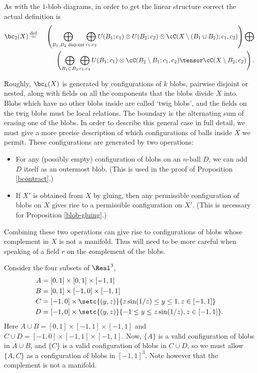 As with the $1$-blob diagrams, in order to get the linear structure correct the actual definition is 
\begin{eqnarray*}
	\bc_2(X) & \deq &
	\left( 
		\bigoplus_{B_1, B_2\; \text{disjoint}} \bigoplus_{c_1, c_2}
			U(B_1; c_1) \otimes U(B_2; c_2) \otimes \lf(X\setmin (B_1\cup B_2); c_1, c_2)
	\right)  \bigoplus \\
	&& \quad\quad  \left( 
		\bigoplus_{B_1 \subset B_2} \bigoplus_{c_1, c_2}
			U(B_1; c_1) \otimes \lf(B_2 \setmin B_1; c_1, c_2) \tensor \cC(X \setminus B_2; c_2)
	\right) .
\end{eqnarray*}

\medskip

Roughly, $\bc_k(X)$ is generated by configurations of $k$ blobs, pairwise disjoint or nested, along with fields on all the components that the blobs divide $X$ into. Blobs which have no other blobs inside are called `twig blobs', and the fields on the twig blobs must be local relations.
The boundary is the alternating sum of erasing one of the blobs.
In order to describe this general case in full detail, we must give a more precise description of
which configurations of balls inside $X$ we permit.
These configurations are generated by two operations:
\begin{itemize}
\item For any (possibly empty) configuration of blobs on an $n$-ball $D$, we can add
$D$ itself as an outermost blob.
(This is used in the proof of Proposition \ref{bcontract}.)
\item If $X'$ is obtained from $X$ by gluing, then any permissible configuration of blobs
on $X$ gives rise to a permissible configuration on $X'$.
(This is necessary for Proposition \ref{blob-gluing}.)
\end{itemize}
Combining these two operations can give rise to configurations of blobs whose complement in $X$ is not
a manifold. 
Thus will need to be more careful when speaking of a field $r$ on the complement of the blobs.

\begin{example}
Consider the four subsets of $\Real^3$,
\begin{align*}
A & = [0,1] \times [0,1] \times [-1,1] \\
B & = [0,1] \times [-1,0] \times [-1,1] \\
C & = [-1,0] \times \setc{(y,z)}{z \sin(1/z) \leq y \leq 1, z \in [-1,1]} \\
D & = [-1,0] \times \setc{(y,z)}{-1 \leq y \leq z \sin(1/z), z \in [-1,1]}.
\end{align*}
Here $A \cup B = [0,1] \times [-1,1] \times [-1,1]$ and $C \cup D = [-1,0] \times [-1,1] \times [-1,1]$. Now, $\{A\}$ is a valid configuration of blobs in $A \cup B$, and $\{C\}$ is a valid configuration of blobs in $C \cup D$, so we must allow $\{A, C\}$ as a configuration of blobs in $[-1,1]^3$. Note however that the complement is not a manifold.
\end{example}

